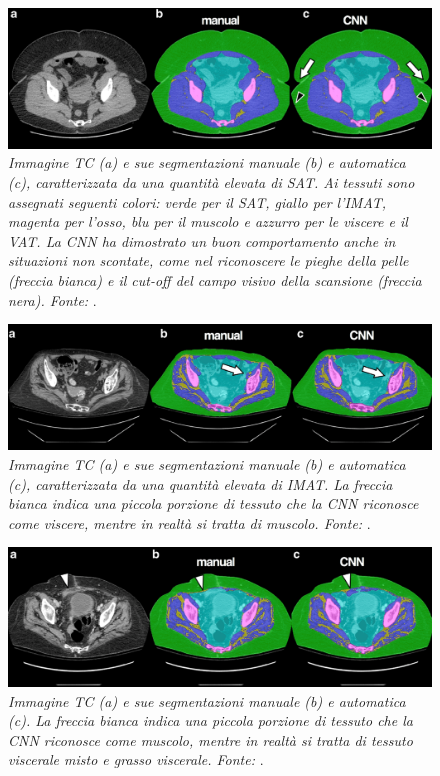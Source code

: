 \begin{figure}[htp]
\centering
\includegraphics[scale=0.615]{Immagini/hemke_segmentazione.png}
\caption{\label{fig:hemke_segmentazione} \textit{Immagine TC (a) e sue segmentazioni manuale (b) e automatica (c), caratterizzata da una quantità elevata di SAT. Ai tessuti sono assegnati seguenti colori: verde per il SAT, giallo per l'IMAT, magenta per l'osso, blu per il muscolo e azzurro per le viscere e il VAT. La CNN ha dimostrato un buon comportamento anche in situazioni non scontate, come nel riconoscere le pieghe della pelle (freccia bianca) e il cut-off del campo visivo della scansione (freccia nera). Fonte:} \cite{Hemke2020}.}
\end{figure}
\begin{figure}[htp]
\centering
\includegraphics[scale=0.615]{Immagini/hemke_viscere.png}
\caption{\label{fig:hemke_viscere} \textit{Immagine TC (a) e sue segmentazioni manuale (b) e automatica (c), caratterizzata da una quantità elevata di IMAT. La freccia bianca indica una piccola porzione di tessuto che la CNN riconosce come viscere, mentre in realtà si tratta di muscolo. Fonte:} \cite{Hemke2020}.}
\end{figure}
\begin{figure}[htp]
\centering
\includegraphics[scale=0.615]{Immagini/hemke_fascia.png}
\caption{\label{fig:hemke_fascia} \textit{Immagine TC (a) e sue segmentazioni manuale (b) e automatica (c). La freccia bianca indica una piccola porzione di tessuto che la CNN riconosce come muscolo, mentre in realtà si tratta di tessuto viscerale misto e grasso viscerale. Fonte:} \cite{Hemke2020}.}
\end{figure}

